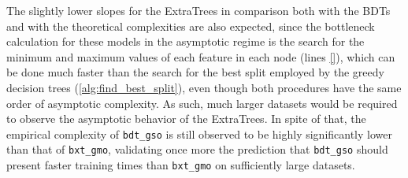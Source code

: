 The slightly lower slopes for the ExtraTrees in comparison both with the BDTs and with the theoretical complexities are also expected, since the bottleneck calculation for these models in the asymptotic regime is the search for the minimum and maximum values of each feature in each node (lines \ref{}), which can be done much faster than the search for the best split employed by the greedy decision trees (\autoref{alg:find_best_split}), even though both procedures have the same order of asymptotic complexity. As such, much larger datasets would be required to observe the asymptotic behavior of the ExtraTrees.
In spite of that, the empirical complexity of \texttt{bdt\_gso} is still observed to be highly significantly lower than that of \texttt{bxt\_gmo}, validating once more the prediction that \texttt{bdt\_gso} should present faster training times than \texttt{bxt\_gmo} on sufficiently large datasets.

